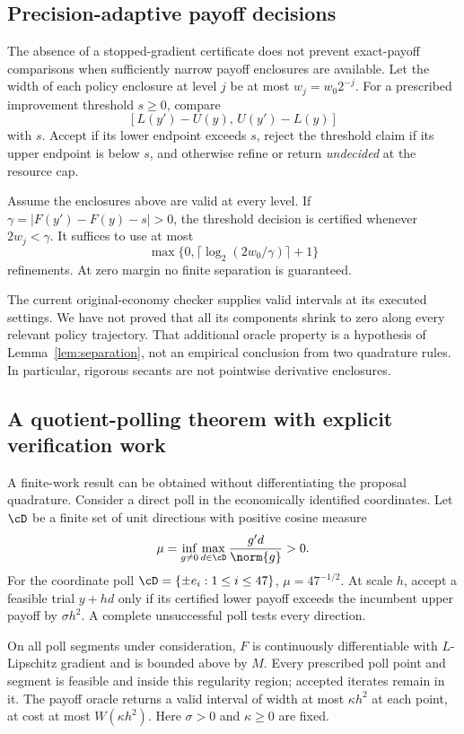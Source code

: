 \subsection{Precision-adaptive payoff decisions}\label{sec:precision}
The absence of a stopped-gradient certificate does not prevent exact-payoff comparisons when sufficiently narrow payoff enclosures are available. Let the width of each policy enclosure at level $j$ be at most $w_j=w_0 2^{-j}$. For a prescribed improvement threshold $s\geq0$, compare
\[
 [L(y')-U(y),\,U(y')-L(y)]
\]
with $s$. Accept if its lower endpoint exceeds $s$, reject the threshold claim if its upper endpoint is below $s$, and otherwise refine or return \emph{undecided} at the resource cap.

\begin{lemma}\label{lem:separation}
Assume the enclosures above are valid at every level. If $\gamma=|F(y')-F(y)-s|>0$, the threshold decision is certified whenever $2w_j<\gamma$. It suffices to use at most
\[
 \max\{0,\lceil\log_2(2w_0/\gamma)\rceil+1\}
\]
refinements. At zero margin no finite separation is guaranteed.
\end{lemma}
The current original-economy checker supplies valid intervals at its executed settings. We have not proved that all its components shrink to zero along every relevant policy trajectory. That additional oracle property is a hypothesis of Lemma~\ref{lem:separation}, not an empirical conclusion from two quadrature rules. In particular, rigorous secants are not pointwise derivative enclosures.

\subsection{A quotient-polling theorem with explicit verification work}\label{sec:polling}
A finite-work result can be obtained without differentiating the proposal quadrature. Consider a direct poll in the economically identified coordinates. Let $\cD$ be a finite set of unit directions with positive cosine measure
\[
 \mu=\inf_{g\ne0}\max_{d\in\cD}\frac{g'd}{\norm{g}}>0.
\]
For the coordinate poll $\cD=\{\pm e_i:1\leq i\leq47\}$, $\mu=47^{-1/2}$. At scale $h$, accept a feasible trial $y+hd$ only if its certified lower payoff exceeds the incumbent upper payoff by $\sigma h^2$. A complete unsuccessful poll tests every direction.

\begin{assumption}\label{ass:poll}
On all poll segments under consideration, $F$ is continuously differentiable with $L$-Lipschitz gradient and is bounded above by $M$. Every prescribed poll point and segment is feasible and inside this regularity region; accepted iterates remain in it. The payoff oracle returns a valid interval of width at most $\kappa h^2$ at each point, at cost at most $W(\kappa h^2)$. Here $\sigma>0$ and $\kappa\geq0$ are fixed.
\end{assumption}

